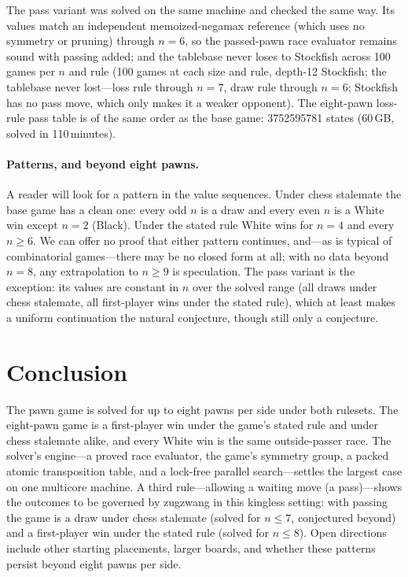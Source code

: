 \documentclass[Afour,sageapa,times]{sagej}
\theoremstyle{plain}
\theoremstyle{definition}
\newcommand{\passEightLossStates}{\num{3752595781}}   %
\newcommand{\passEightLossSize}{60\,GB}
\newcommand{\passEightLossTime}{110\,minutes}
\newcommand{\passLossMaxN}{8}   %
\newcommand{\passDrawMaxN}{7}   %
\newcommand{\passSF}{100 games at each size and rule, depth-12 Stockfish; the
tablebase never lost---loss rule through $n=7$, draw rule through $n=6$}
\begin{document}
The pass variant was solved on the same machine and checked the same way. Its values
match an independent memoized-negamax reference (which uses no symmetry or pruning)
through $n=6$, so the passed-pawn race evaluator remains sound with passing added;
and the tablebase never loses to Stockfish across 100 games per $n$ and rule
(\passSF; Stockfish has no pass move, which only makes it a weaker opponent). The
eight-pawn loss-rule pass table is of the same order as the base game:
\passEightLossStates{} states (\passEightLossSize, solved in \passEightLossTime).

\paragraph{Patterns, and beyond eight pawns.} A reader will look for a pattern in the
value sequences. Under chess stalemate the base game has a clean one: every odd $n$
is a draw and every even $n$ is a White win except $n=2$ (Black). Under the stated
rule White wins for $n=4$ and every $n\ge 6$. We can offer no proof that either
pattern continues, and---as is typical of combinatorial games---there may be no
closed form at all; with no data beyond $n=8$, any extrapolation to $n\ge 9$ is
speculation. The pass variant is the exception: its values are constant in $n$ over
the solved range (all draws under chess stalemate, all first-player wins under the
stated rule), which at least makes a uniform continuation the natural conjecture,
though still only a conjecture.

\section{Conclusion}

The pawn game is solved for up to eight pawns per side under both rulesets. The
eight-pawn game is a first-player win under the game's stated rule and under chess
stalemate alike, and every White win is the same outside-passer race. The solver's
engine---a proved race evaluator, the game's symmetry group, a packed atomic
transposition table, and a lock-free parallel search---settles the largest case on
one multicore machine. A third rule---allowing a waiting move (a pass)---shows the
outcomes to be governed by zugzwang in this kingless setting: with passing the game
is a draw under chess stalemate (solved for $n\le\passDrawMaxN$, conjectured beyond)
and a first-player win under the stated rule (solved for $n\le\passLossMaxN$).
Open directions include other starting placements, larger boards, and whether these
patterns persist beyond eight pawns per side.
\end{document}
